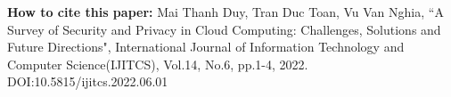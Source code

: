 \documentclass{ijitcs}
\begin{document}
 




   


\nocite{*}




 


{\fontsize{9pt}{9pt} \selectfont\noindent \textbf{How to cite this paper:} 
Mai Thanh Duy, Tran Duc Toan,   Vu Van Nghia, ``A Survey of Security and Privacy  in  Cloud Computing: Challenges, Solutions   and Future Directions", International Journal of Information Technology and Computer Science(IJITCS), Vol.14, No.6, pp.1-4, 2022. DOI:10.5815/ijitcs.2022.06.01}
\end{document}
